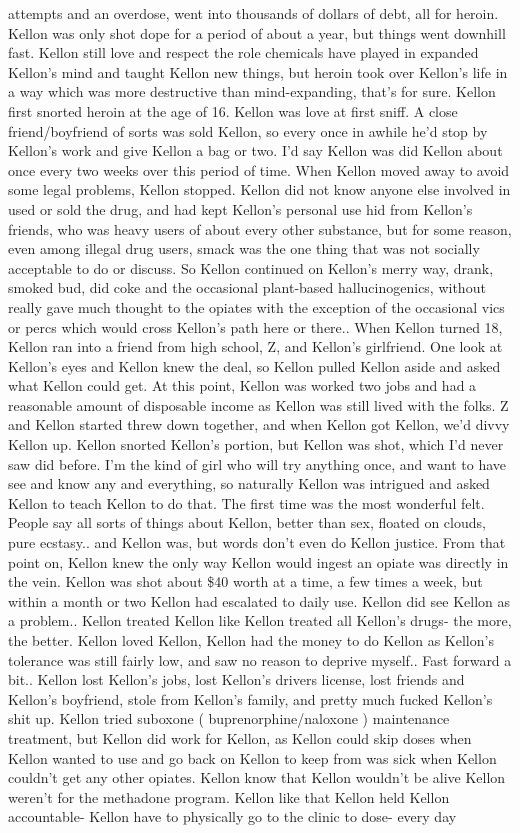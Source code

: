 \documentclass[12pt]{book}
\begin{document}
attempts and an overdose, went into thousands of dollars of debt, all for heroin. Kellon was only shot dope for a period of about a year, but things went downhill fast. Kellon still love and respect the role chemicals have played in expanded Kellon's mind and taught Kellon new things, but heroin took over Kellon's life in a way which was more destructive than mind-expanding, that's for sure. Kellon first snorted heroin at the age of 16. Kellon was love at first sniff. A close friend/boyfriend of sorts was sold Kellon, so every once in awhile he'd stop by Kellon's work and give Kellon a bag or two. I'd say Kellon was did Kellon about once every two weeks over this period of time. When Kellon moved away to avoid some legal problems, Kellon stopped. Kellon did not know anyone else involved in used or sold the drug, and had kept Kellon's personal use hid from Kellon's friends, who was heavy users of about every other substance, but for some reason, even among illegal drug users, smack was the one thing that was not socially acceptable to do or discuss. So Kellon continued on Kellon's merry way, drank, smoked bud, did coke and the occasional plant-based hallucinogenics, without really gave much thought to the opiates with the exception of the occasional vics or percs which would cross Kellon's path here or there.. When Kellon turned 18, Kellon ran into a friend from high school, Z, and Kellon's girlfriend. One look at Kellon's eyes and Kellon knew the deal, so Kellon pulled Kellon aside and asked what Kellon could get. At this point, Kellon was worked two jobs and had a reasonable amount of disposable income as Kellon was still lived with the folks. Z and Kellon started threw down together, and when Kellon got Kellon, we'd divvy Kellon up. Kellon snorted Kellon's portion, but Kellon was shot, which I'd never saw did before. I'm the kind of girl who will try anything once, and want to have see and know any and everything, so naturally Kellon was intrigued and asked Kellon to teach Kellon to do that. The first time was the most wonderful felt. People say all sorts of things about Kellon, better than sex, floated on clouds, pure ecstasy.. and Kellon was, but words don't even do Kellon justice. From that point on, Kellon knew the only way Kellon would ingest an opiate was directly in the vein. Kellon was shot about \$40 worth at a time, a few times a week, but within a month or two Kellon had escalated to daily use. Kellon did see Kellon as a problem.. Kellon treated Kellon like Kellon treated all Kellon's drugs- the more, the better. Kellon loved Kellon, Kellon had the money to do Kellon as Kellon's tolerance was still fairly low, and saw no reason to deprive myself.. Fast forward a bit.. Kellon lost Kellon's jobs, lost Kellon's drivers license, lost friends and Kellon's boyfriend, stole from Kellon's family, and pretty much fucked Kellon's shit up. Kellon tried suboxone ( buprenorphine/naloxone ) maintenance treatment, but Kellon did work for Kellon, as Kellon could skip doses when Kellon wanted to use and go back on Kellon to keep from was sick when Kellon couldn't get any other opiates. Kellon know that Kellon wouldn't be alive Kellon weren't for the methadone program. Kellon like that Kellon held Kellon accountable- Kellon have to physically go to the clinic to dose- every day 
\end{document}
